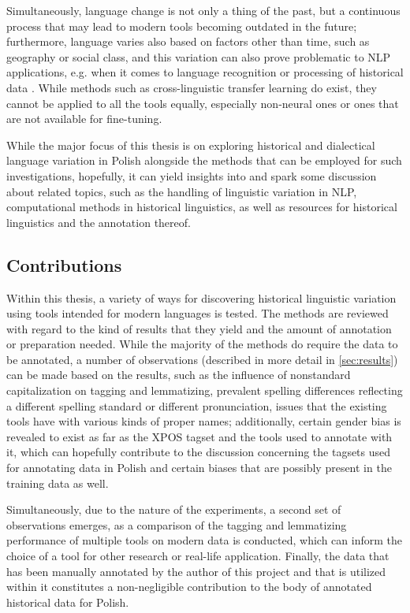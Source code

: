 Simultaneously, language change is not only a thing of the past, but a continuous process that may lead to modern tools becoming outdated in the future; furthermore, language varies also based on factors other than time, such as geography or social class, and this variation can also prove problematic to NLP applications, e.g. when it comes to language recognition or processing of historical data \citep{jurgens-etal-2017-incorporating, regnault-etal-2019-challenges, Zampieri2020NaturalLP}. While methods such as cross-linguistic transfer learning do exist, they cannot be applied to all the tools equally, especially non-neural ones or ones that are not available for fine-tuning.

While the major focus of this thesis is on exploring historical and dialectical language variation in Polish alongside the methods that can be employed for such investigations, hopefully, it can yield insights into and spark some discussion about related topics, such as the handling of linguistic variation in NLP, computational methods in historical linguistics, as well as resources for historical linguistics and the annotation thereof.

\subsection{Contributions}
\label{subsec:contributions}

Within this thesis, a variety of ways for discovering historical linguistic variation using tools intended for modern languages is tested. The methods are reviewed with regard to the kind of results that they yield and the amount of annotation or preparation needed. While the majority of the methods do require the data to be annotated, a number of observations (described in more detail in \autoref{sec:results}) can be made based on the results, such as the influence of nonstandard capitalization on tagging and lemmatizing, prevalent spelling differences reflecting a different spelling standard or different pronunciation, issues that the existing tools have with various kinds of proper names; additionally, certain gender bias is revealed to exist as far as the XPOS tagset and the tools used to annotate with it, which can hopefully contribute to the discussion concerning the tagsets used for annotating data in Polish and certain biases that are possibly present in the training data as well.

Simultaneously, due to the nature of the experiments, a second set of observations emerges, as a comparison of the tagging and lemmatizing performance of multiple tools on modern data is conducted, which can inform the choice of a tool for other research or real-life application. Finally, the data that has been manually annotated by the author of this project and that is utilized within it constitutes a non-negligible contribution to the body of annotated historical data for Polish. 

